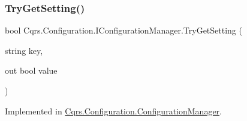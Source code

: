 \mbox{\label{interfaceCqrs_1_1Configuration_1_1IConfigurationManager_a8389181330999fcb8e30af4dbb56d35e_a8389181330999fcb8e30af4dbb56d35e}} 
\subsubsection{\texorpdfstring{Try\+Get\+Setting()}{TryGetSetting()}\hspace{0.1cm}{\footnotesize\ttfamily [2/2]}}
{\footnotesize\ttfamily bool Cqrs.\+Configuration.\+I\+Configuration\+Manager.\+Try\+Get\+Setting (\begin{DoxyParamCaption}\item[{string}]{key,  }\item[{out bool}]{value }\end{DoxyParamCaption})}



Implemented in \hyperlink{classCqrs_1_1Configuration_1_1ConfigurationManager_a40810d0b9fd2f3d1c4a270681e908c84_a40810d0b9fd2f3d1c4a270681e908c84}{Cqrs.\+Configuration.\+Configuration\+Manager}.

